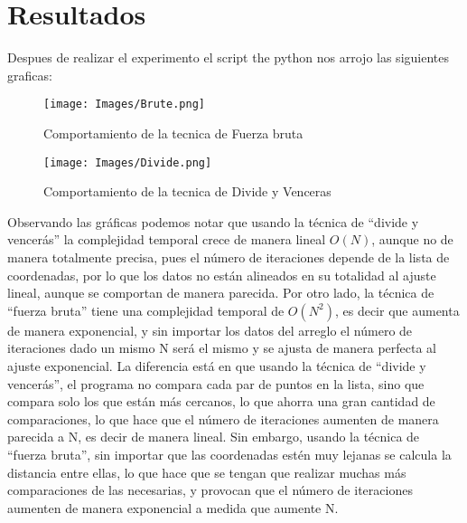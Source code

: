 \section{Resultados}
Despues de realizar el experimento el script the python nos arrojo las siguientes graficas:
\begin{figure}[H]
    \centering   
    \texttt{[image: Images/Brute.png]}
    \caption{Comportamiento de la tecnica de Fuerza bruta}
\end{figure}%

\begin{figure}[H]
    \centering    
    \texttt{[image: Images/Divide.png]}
    \caption{Comportamiento de la tecnica de Divide y Venceras}
\end{figure}%

Observando las gráficas podemos notar que usando la técnica de “divide y vencerás” la complejidad temporal crece de manera lineal $O(N)$, aunque no de manera totalmente precisa, pues el número de iteraciones depende de la lista de coordenadas, por lo que los datos no están alineados en su totalidad al ajuste lineal, aunque se comportan de manera parecida. Por otro lado, la técnica de “fuerza bruta” tiene una complejidad temporal de $O(N^2)$, es decir que aumenta de manera exponencial, y sin importar los datos del arreglo el número de iteraciones dado un mismo N será el mismo y se ajusta de manera perfecta al ajuste exponencial. La diferencia está en que usando la técnica de “divide y vencerás”, el programa no compara cada par de puntos en la lista, sino que compara solo los que están más cercanos, lo que ahorra una gran cantidad de comparaciones, lo que hace que el número de iteraciones aumenten de manera parecida a N, es decir de manera lineal. Sin embargo, usando la técnica de “fuerza bruta”, sin importar que las coordenadas estén muy lejanas se calcula la distancia entre ellas, lo que hace que se tengan que realizar muchas más comparaciones de las necesarias, y provocan que el número de iteraciones aumenten de manera exponencial a medida que aumente N.